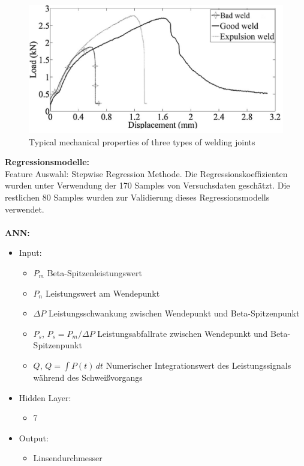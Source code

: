 \documentclass[english,ngerman]{tudscrreprt}
\begin{document}
\begin{figure}[H]
\centering
\includegraphics[scale = 0.7]{./Bilder/Typical mechanical properties of three types of welding joints.png}
\caption{Typical mechanical properties of three types of welding joints}\label{fgg:T}
\end{figure}
\noindent
\textbf{Regressionsmodelle: }\\
Feature Auswahl: Stepwise Regression Methode. Die Regressionskoeffizienten wurden unter Verwendung der 170 Samples von Versuchsdaten geschätzt. Die restlichen 80 Samples wurden zur Validierung dieses Regressionsmodells verwendet.\\
\\
\textbf{ANN: }
\begin{itemize}
\item Input:
\begin{itemize}
	\item $P_{m}$ Beta-Spitzenleistungswert
	\item $P_{n}$ Leistungswert am Wendepunkt
	\item $\Delta P$ Leistungsschwankung zwischen Wendepunkt und Beta-Spitzenpunkt
	\item $P_{s}$, $P_{s} = P_{m}/\Delta P$ Leistungsabfallrate zwischen Wendepunkt und Beta-Spitzenpunkt
	\item $Q$, $Q = {\int P(t)\,dt}$ Numerischer Integrationswert des Leistungssignals während des Schweißvorgangs
\end{itemize}
\item Hidden Layer:
\begin{itemize}
	\item 7
\end{itemize}
\item Output:
\begin{itemize}
	\item Linsendurchmesser
\end{itemize}
\end{itemize}
\end{document}
